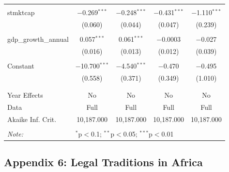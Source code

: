 \documentclass[a4paper, nobind]{templates/ociamthesis}
\begin{document}
\begin{table}[!htbp]
\begin{tabular}{@{\extracolsep{5pt}}lcccc}
  & & & & \\ 
 stmktcap & $-$0.269$^{***}$ & $-$0.248$^{***}$ & $-$0.431$^{***}$ & $-$1.110$^{***}$ \\ 
  & (0.060) & (0.044) & (0.047) & (0.239) \\ 
  & & & & \\ 
 gdp\_growth\_annual & 0.057$^{***}$ & 0.061$^{***}$ & $-$0.0003 & $-$0.027 \\ 
  & (0.016) & (0.013) & (0.012) & (0.039) \\ 
  & & & & \\ 
 Constant & $-$10.700$^{***}$ & $-$4.540$^{***}$ & $-$0.470 & $-$0.495 \\ 
  & (0.558) & (0.371) & (0.349) & (1.010) \\ 
  & & & & \\ 
\hline \\[-1.8ex] 
Year Effects & No & No & No & No \\ 
Data & Full & Full & Full & Full \\ 
Akaike Inf. Crit. & 10,187.000 & 10,187.000 & 10,187.000 & 10,187.000 \\ 
\hline 
\hline \\[-1.8ex] 
\textit{Note:}  & \multicolumn{4}{l}{$^{*}$p$<$0.1; $^{**}$p$<$0.05; $^{***}$p$<$0.01} \\ 
\end{tabular} 
\end{table}

\newpage

\hypertarget{appendix-6-legal-traditions-in-africa}{%
\subsection{Appendix 6: Legal Traditions in Africa}\label{appendix-6-legal-traditions-in-africa}}
\end{document}
